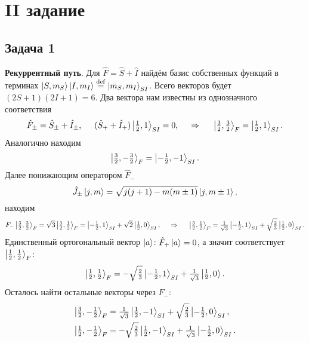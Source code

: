 \section{II задание}

\subsection*{Задача 1}

\textbf{Рекуррентный путь}. 
Для $\hat{F} = \hat{S} + \hat{I}$ найдём базис собственных функций в терминах 
$\left| S, m_S \right\rangle\left| I, m_I \right\rangle \overset{\mathrm{def}}{=} \left| m_S, m_I \right\rangle_{SI}$.
Всего векторов будет $(2 S + 1)(2 I + 1) = 6$. 
 Два вектора нам известны из однозначного соответствия
\begin{equation*}
    \hat{F}_\pm = \hat{S}_\pm + \hat{I}_\pm, 
    \hspace{5 mm} 
    (\hat{S}_+ + \hat{I}_+) \left| \tfrac{1}{2}, 1 \right\rangle_{SI} = 0,
    \hspace{0.5cm} \Rightarrow \hspace{0.5cm}
    \left| \tfrac{3}{2}, \tfrac{3}{2} \right\rangle_F = \left| \tfrac{1}{2}, 1 \right\rangle_{SI}.
\end{equation*}
Аналогично находим
\begin{equation*}
    \left| \tfrac{3}{2}, -\tfrac{3}{2} \right\rangle_F = \left| -\tfrac{1}{2}, -1 \right\rangle_{SI}.
\end{equation*}
Далее понижающим оператором $\hat{F}_-$ 
\begin{equation*}
    \hat{J}_\pm \left| j,m \right\rangle = \sqrt{j (j + 1) - m (m \pm 1)} \left| j, m\pm 1 \right\rangle,
\end{equation*}
находим
\begin{equation*}
    F_- \left| \tfrac{3}{2}, \tfrac{3}{2} \right\rangle_F = \sqrt{3} \left| \tfrac{3}{2}, \tfrac{1}{2} \right\rangle_F = \left| -\tfrac{1}{2},1 \right\rangle_{SI} + \sqrt{2} \left| \tfrac{1}{2},0 \right\rangle_{SI},
    \hspace{0.5cm} \Rightarrow \hspace{0.5cm}
    \left| \tfrac{3}{2},\tfrac{1}{2} \right\rangle_F = \tfrac{1}{\sqrt{3}} \left| - \tfrac{1}{2}, 1 \right\rangle_{SI} + \sqrt{\tfrac{2}{3}} \left| \tfrac{1}{2},0 \right\rangle_{SI}.
\end{equation*}
Единственный ортогональный вектор $\left| a \right\rangle$: $\hat{F}_+ \left| a \right\rangle = 0$, а значит соответствует $\left| \tfrac{1}{2}, \tfrac{1}{2} \right\rangle_F$:
\begin{equation*}
    \left| \tfrac{1}{2}, \tfrac{1}{2} \right\rangle_F = - \sqrt{\tfrac{2}{3}}\left| -\tfrac{1}{2}, 1 \right\rangle_{SI} + \tfrac{1}{\sqrt{3}} \left| \tfrac{1}{2},0 \right\rangle.
\end{equation*}
Осталось найти остальные векторы через $F_-$:
\begin{align*}
    \left| \tfrac{3}{2}, -\tfrac{1}{2} \right\rangle_F &= \tfrac{1}{\sqrt{3}} \left| \tfrac{1}{2},-1 \right\rangle_{SI} + \sqrt{\tfrac{2}{3}} \left| -\tfrac{1}{2}, 0 \right\rangle_{SI}, \\
    \left| \tfrac{1}{2}, -\tfrac{1}{2} \right\rangle_F &= -\sqrt{\tfrac{2}{3}} \left| \tfrac{1}{2}, -1 \right\rangle_{SI} + \tfrac{1}{\sqrt{3}}\left| -\tfrac{1}{2},0 \right\rangle_{SI}.
\end{align*}

